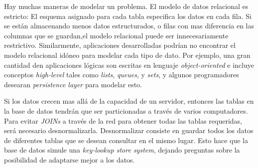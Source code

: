 Hay muchas maneras de modelar un problema. El modelo de datos relacional es estricto: El esquema asignado para cada tabla especifica los datos en cada fila. Si se están almacenando menos datos estructurados, o filas con mas diferencia en las columnas que se guardan,el modelo relacional puede ser innecesariamente restrictivo. Similarmente, aplicaciones desarrolladas podrían no encontrar el modelo relacional idóneo para modelar cada tipo de dato. Por ejemplo, una gran cantidad den aplicaciones lógicas son escritas en lenguaje \textit{object-oriented} e incluye conceptos \textit{high-level} tales como \textit{lists}, \textit{queues}, y \textit{sets}, y algunos programadores desearan \textit{persistence layer} para modelar esto.

Si los datos crecen mas allá de la capacidad de un servidor, entonces las tablas en la base de datos tendrán que ser particionadas a través de varios computadores. Para evitar \textit{JOINs} a través de la red para obtener todas las tablas requeridas, será necesario desnormalizarla. Desnormalizar consiste en guardar todos los datos de diferentes tablas que se desean consultar en el mismo lugar. Esto hace que la base de datos simule una \textit{key-lookup store system}, dejando preguntas sobre la posibilidad de adaptarse mejor a los datos.

